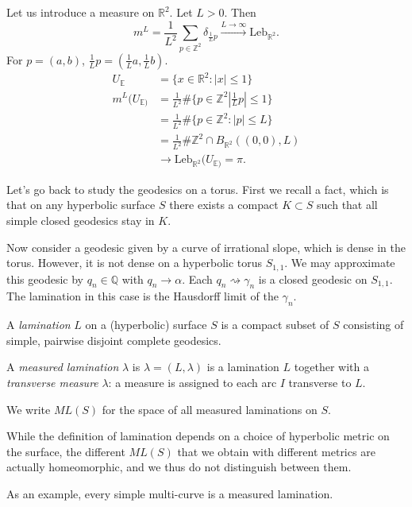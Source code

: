 \medskip\noindent
Let us introduce a measure on $\mathbb{R}^2$.
Let $L>0$. Then
$$
m^L=\frac{1}{L^2}\sum_{p \in
\mathbb{Z}^2}\delta_{\frac{1}{L}p}
\xrightarrow{L \to
\infty}\text{Leb}_{\mathbb{R}^2}.
$$
For $p=(a,b)$,
$\frac{1}{L}p=(\frac{1}{L}a,\frac{1}{L}b)$.
$$
\begin{aligned}
U_{\mathbb{E}}&=\{x \in \mathbb{R}^2:|x|\leq
1\}\\
m^L(U_{\mathbb{E})}&=\frac{1}{L^2}\#\{p \in
\mathbb{Z}^2
\left|\frac{1}{L}p\right|\leq 1\}\\
&=\frac{1}{L^2}\#\{p \in \mathbb{Z}^2:|p|\leq
L\}\\
&=\frac{1}{L^2}\#\mathbb{Z}^2 \cap
B_{\mathbb{R}^2}((0,0),L)\\
&\to\text{Leb}_{\mathbb{R}^2}(U_{\mathbb{E})}
=\pi.
\end{aligned}
$$

\medskip\noindent
Let's go back to study the geodesics on a
torus.
First we recall a fact, which is that
on any hyperbolic surface $S$ there exists a
compact $K \subset S$ such that all
simple closed geodesics stay in $K$.

Now consider a geodesic given by a curve of
irrational slope,
which is dense in the torus. However,
it is not dense on a hyperbolic torus
$S_{1,1}$.
We may approximate this geodesic by $q_n \in
\mathbb{Q}$ with
$q_n \to \alpha$. Each $q_n \rightsquigarrow
\gamma_n$
is a closed geodesic on $S_{1,1}$.
The lamination in this case is the Hausdorff
limit
of the $\gamma_n$.

\begin{definition}
\label{definition-lamination}
A {\it lamination} $L$ on a (hyperbolic)
surface $S$
is a compact subset of $S$ consisting of
simple, pairwise
disjoint complete geodesics.

A {\it measured lamination} $\lambda$ is
$\lambda=(L,\lambda)$ is a lamination $L$
together with a {\it transverse measure}
$\lambda$:
a measure is assigned to each arc $I$
transverse to $L$.

We write $ML(S)$ for the space of all
measured laminations on $S$.
\end{definition}

\noindent
While the definition of lamination depends on
a choice
of hyperbolic metric on the surface, the
different $ML(S)$
that we obtain with different metrics are
actually homeomorphic,
and we thus do not distinguish between them.

As an example, every simple multi-curve is a
measured lamination.

